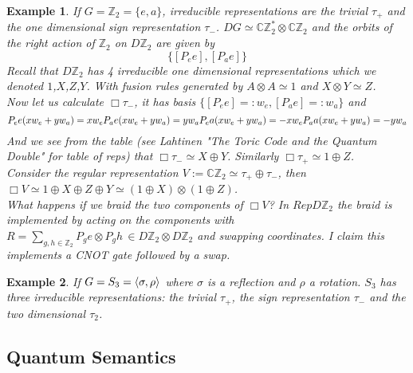 \documentclass{article}
\newtheorem{example}{Example}
\begin{document}
\begin{example}
If $G=\mathbb{Z}_2= \{e,a\}$, irreducible representations are the trivial $\tau_+$ and the one dimensional sign representation $\tau_-$. $DG \simeq \mathbb{C}\mathbb{Z}_2^* \otimes \mathbb{C}\mathbb{Z}_2$ and the orbits of the right action of $\mathbb{Z}_2$ on $D\mathbb{Z}_2$ are given by
$$ \{ [P_ee], [P_ae] \}$$
Recall that $D\mathbb{Z}_2$ has 4 irreducible one dimensional representations which we denoted $1$,$X$,$Z$,$Y$. With fusion rules generated by $A \otimes A \simeq 1$ and $X \otimes Y \simeq Z$. \\
Now let us calculate $\Box \tau_-$, it has basis $\{[P_ee] =:w_e, [P_ae] =:w_a \}$ and 
\begin{equation*}
P_ee(xw_e + yw_a)= xw_e \\
P_ae(xw_e + yw_a)= yw_a \\
P_ea(xw_e + yw_a)= -xw_e \\ 
P_aa(xw_e + yw_a)= -yw_a
\end{equation*}
And we see from the table (see Lahtinen "The Toric Code and the Quantum Double" for table of reps) that $\Box \tau_- \simeq X \oplus Y$. Similarly $\Box \tau_+ \simeq 1 \oplus Z$. \\
Consider the regular representation $V := \mathbb{C}\mathbb{Z}_2 \simeq \tau_+ \oplus \tau_-$, then $\Box V \simeq 1 \oplus X \oplus Z \oplus Y \simeq (1 \oplus X) \otimes (1 \oplus Z) $.\\
What happens if we braid the two components of $\Box V$? In $RepD\mathbb{Z}_2$ the braid is implemented by acting on the components with $R=\sum_{g,h\in\mathbb{Z}_2} P_ge \otimes P_gh \, \in D\mathbb{Z}_2\otimes D\mathbb{Z}_2$ and swapping coordinates. I claim this implements a CNOT gate followed by a swap.
\end{example}

\begin{example}
If $G=S_3=\braket{\sigma,\rho}$ where $\sigma$ is a reflection and $\rho$ a rotation. $S_3$ has three irreducible representations: the trivial $\tau_+$, the sign representation $\tau_-$ and the two dimensional $\tau_2$.
\end{example}



\subsection{Quantum Semantics}
\end{document}
